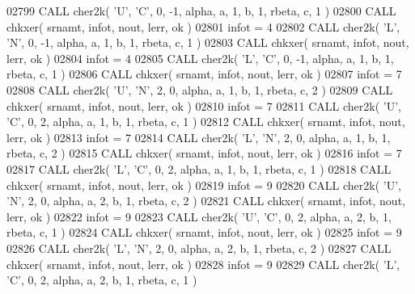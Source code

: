 \begin{DoxyCode}
02799       \textcolor{keyword}{CALL }cher2k( \textcolor{stringliteral}{'U'}, \textcolor{stringliteral}{'C'}, 0, -1, alpha, a, 1, b, 1, rbeta, c, 1 )
02800       \textcolor{keyword}{CALL }chkxer( srnamt, infot, nout, lerr, ok )
02801       infot = 4
02802       \textcolor{keyword}{CALL }cher2k( \textcolor{stringliteral}{'L'}, \textcolor{stringliteral}{'N'}, 0, -1, alpha, a, 1, b, 1, rbeta, c, 1 )
02803       \textcolor{keyword}{CALL }chkxer( srnamt, infot, nout, lerr, ok )
02804       infot = 4
02805       \textcolor{keyword}{CALL }cher2k( \textcolor{stringliteral}{'L'}, \textcolor{stringliteral}{'C'}, 0, -1, alpha, a, 1, b, 1, rbeta, c, 1 )
02806       \textcolor{keyword}{CALL }chkxer( srnamt, infot, nout, lerr, ok )
02807       infot = 7
02808       \textcolor{keyword}{CALL }cher2k( \textcolor{stringliteral}{'U'}, \textcolor{stringliteral}{'N'}, 2, 0, alpha, a, 1, b, 1, rbeta, c, 2 )
02809       \textcolor{keyword}{CALL }chkxer( srnamt, infot, nout, lerr, ok )
02810       infot = 7
02811       \textcolor{keyword}{CALL }cher2k( \textcolor{stringliteral}{'U'}, \textcolor{stringliteral}{'C'}, 0, 2, alpha, a, 1, b, 1, rbeta, c, 1 )
02812       \textcolor{keyword}{CALL }chkxer( srnamt, infot, nout, lerr, ok )
02813       infot = 7
02814       \textcolor{keyword}{CALL }cher2k( \textcolor{stringliteral}{'L'}, \textcolor{stringliteral}{'N'}, 2, 0, alpha, a, 1, b, 1, rbeta, c, 2 )
02815       \textcolor{keyword}{CALL }chkxer( srnamt, infot, nout, lerr, ok )
02816       infot = 7
02817       \textcolor{keyword}{CALL }cher2k( \textcolor{stringliteral}{'L'}, \textcolor{stringliteral}{'C'}, 0, 2, alpha, a, 1, b, 1, rbeta, c, 1 )
02818       \textcolor{keyword}{CALL }chkxer( srnamt, infot, nout, lerr, ok )
02819       infot = 9
02820       \textcolor{keyword}{CALL }cher2k( \textcolor{stringliteral}{'U'}, \textcolor{stringliteral}{'N'}, 2, 0, alpha, a, 2, b, 1, rbeta, c, 2 )
02821       \textcolor{keyword}{CALL }chkxer( srnamt, infot, nout, lerr, ok )
02822       infot = 9
02823       \textcolor{keyword}{CALL }cher2k( \textcolor{stringliteral}{'U'}, \textcolor{stringliteral}{'C'}, 0, 2, alpha, a, 2, b, 1, rbeta, c, 1 )
02824       \textcolor{keyword}{CALL }chkxer( srnamt, infot, nout, lerr, ok )
02825       infot = 9
02826       \textcolor{keyword}{CALL }cher2k( \textcolor{stringliteral}{'L'}, \textcolor{stringliteral}{'N'}, 2, 0, alpha, a, 2, b, 1, rbeta, c, 2 )
02827       \textcolor{keyword}{CALL }chkxer( srnamt, infot, nout, lerr, ok )
02828       infot = 9
02829       \textcolor{keyword}{CALL }cher2k( \textcolor{stringliteral}{'L'}, \textcolor{stringliteral}{'C'}, 0, 2, alpha, a, 2, b, 1, rbeta, c, 1 )

\end{DoxyCode}
